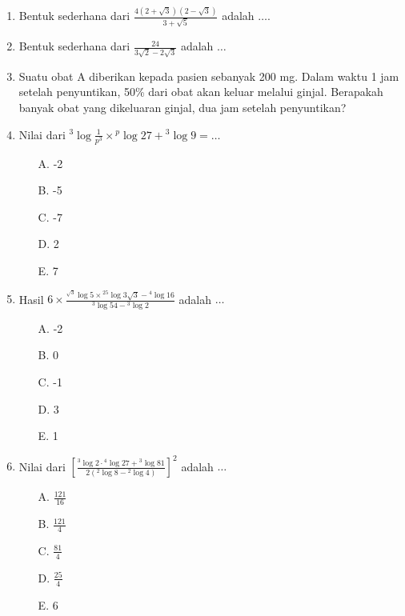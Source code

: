 \documentclass{article}
\begin{document}
\begin{enumerate}
    \item Bentuk sederhana dari $\displaystyle \frac{4(2+\sqrt{3})(2-\sqrt{3})}{3+\sqrt{5}}$ adalah $\dots$.

    \item Bentuk sederhana dari $\displaystyle \frac{24}{3\sqrt{2}-2\sqrt{3}}$ adalah $\dots$
    \item Suatu obat A diberikan kepada pasien sebanyak 200 mg. Dalam waktu 1 jam setelah penyuntikan, 50\% dari obat akan keluar melalui ginjal. Berapakah banyak obat yang dikeluaran ginjal, dua jam setelah penyuntikan?
    \item Nilai dari $\displaystyle {}^3 \log \frac{1}{p^3} \times {}^p \log 27 + {}^3 \log 9 = \dots$
    \begin{multicols}{3}
        \begin{enumerate}
            \item[A.] -2
            \item[B.] -5
            \item[C.] -7
            \item[D.] 2
            \item[E.] 7
        \end{enumerate}
    \end{multicols}

    \item Hasil $\displaystyle 6 \times \frac{{}^{\sqrt{3}} \log 5 \times {}^{25} \log 3 \sqrt{3} -{}^4 \log 16}{{}^3 \log 54 - {}^3 \log 2}$ adalah $\dots$
    \begin{multicols}{3}
        \begin{enumerate}
            \item[A.] -2
            \item[B.] 0
            \item[C.] -1
            \item[D.] 3
            \item[E.] 1
        \end{enumerate}
    \end{multicols}
    \item Nilai dari $\displaystyle \left[ \frac{{}^3 \log 2 \cdot {}^4 \log 27 + {}^3 \log 81}{2\left({}^2 \log 8 - {}^2 \log 4\right)} \right]^2$ adalah $\dots$
    \begin{multicols}{3}
        \begin{enumerate}
            \item[A.] $\displaystyle \frac{121}{16}$
            \item[B.] $\displaystyle \frac{121}{4}$
            \item[C.] $\displaystyle \frac{81}{4}$
            \item[D.] $\displaystyle \frac{25}{4}$
            \item[E.] 6
        \end{enumerate}
    \end{multicols}


\end{enumerate}
\end{document}

